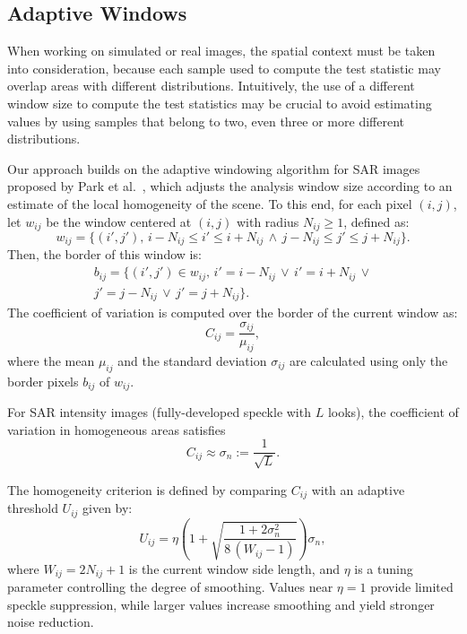 \documentclass[
  lettersize  journal,
]{IEEEtran}%
\begin{document}
\subsection{Adaptive Windows}\label{sec:adaptive}

When working on simulated or real images, the spatial context must be
taken into consideration, because each sample used to compute the test
statistic may overlap areas with different distributions. Intuitively,
the use of a different window size to compute the test statistics may be
crucial to avoid estimating values by using samples that belong to two,
even three or more different distributions.

Our approach builds on the adaptive windowing algorithm for SAR images
proposed by Park et al.~, which adjusts
the analysis window size according to an estimate of the local
homogeneity of the scene. To this end, for each pixel \((i,j)\), let
\(w_{ij}\) be the window centered at \((i,j)\) with radius
\(N_{ij} \ge 1\), defined as: \begin{equation*}
w_{ij} = \{(i',j'),\, i-N_{ij} \le i' \le i+N_{ij} \,\wedge\, j-N_{ij} \le j' \le j+N_{ij}\}.
\end{equation*} Then, the border of this window is: \begin{multline*}
b_{ij} = \{(i',j') \in w_{ij},\, i' = i-N_{ij} \,\vee\, i' = i+N_{ij} \,\vee\\
j' = j-N_{ij} \,\vee\, j' = j+N_{ij}\}.
\end{multline*} The coefficient of variation is computed over the border
of the current window as: \begin{equation*}
C_{ij} = \frac{\sigma_{ij}}{\mu_{ij}},
\end{equation*} where the mean \(\mu_{ij}\) and the standard deviation
\(\sigma_{ij}\) are calculated using only the border pixels \(b_{ij}\)
of \(w_{ij}\).

For SAR intensity images (fully-developed speckle with \(L\) looks), the
coefficient of variation in homogeneous areas satisfies
\begin{equation*}
C_{ij} \approx \sigma_n := \frac{1}{\sqrt{L}}.
\end{equation*}

The homogeneity criterion is defined by comparing \(C_{ij}\) with an
adaptive threshold \(U_{ij}\) given by: \begin{equation*}
U_{ij} = \eta\!\left( 1 + \sqrt{\frac{1 + 2\sigma_n^2}{8\,(W_{ij} - 1)}} \right)\sigma_n,
\end{equation*} where \(W_{ij} = 2N_{ij} + 1\) is the current window
side length, and \(\eta\) is a tuning parameter controlling the degree
of smoothing. Values near \(\eta=1\) provide limited speckle
suppression, while larger values increase smoothing and yield stronger
noise reduction.
\end{document}

